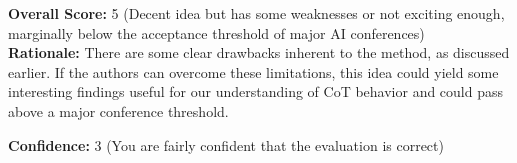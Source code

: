 \begin{tcolorbox}[colback=green!10!white, colframe=green!80!black, title=\textbf{Reviewer 1}]
\vspace{10pt}

\textbf{Overall Score:} 5 (Decent idea but has some weaknesses or not exciting enough, marginally below the acceptance threshold of major AI conferences)\\
\textbf{Rationale:} There are some clear drawbacks inherent to the method, as discussed earlier. If the authors can overcome these limitations, this idea could yield some interesting findings useful for our understanding of CoT behavior and could pass above a major conference threshold.

\vspace{10pt}

\textbf{Confidence:} 3 (You are fairly confident that the evaluation is correct)
\end{tcolorbox}

\vspace{20pt}

